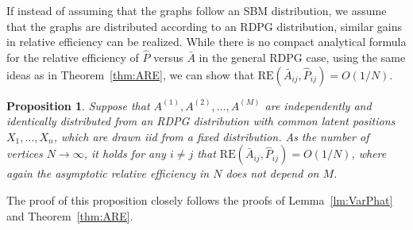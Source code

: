 \documentclass[journal,twoside,web]{ieeecolor}
\newtheorem{proposition}[fact]{Proposition}
\begin{document}



If instead of assuming that the graphs follow an SBM distribution, we assume that the graphs are distributed according to an RDPG distribution, similar gains in relative efficiency can be realized.
While there is no compact analytical formula for the relative efficiency of $\hat{P}$ versus $\bar{A}$ in the general RDPG case, using the same ideas as in Theorem~\ref{thm:ARE}, we can show that $\mathrm{RE}(\bar{A}_{ij},\hat{P}_{ij}) = O(1/N)$.

\begin{proposition}
Suppose that $A^{(1)},A^{(2)},\dotsc,A^{(M)}$ are independently and identically distributed from an RDPG distribution with common latent positions $X_1,\dotsc,X_n$, which are drawn iid from a fixed distribution.
As the number of vertices $N\to\infty$, it holds for any $i\neq j$ that $\mathrm{RE}(\bar{A}_{ij},\hat{P}_{ij}) = O(1/N)$,
where again the asymptotic relative efficiency in $N$ does not depend on $M$.
\end{proposition}
The proof of this proposition closely follows the proofs of Lemma~\ref{lm:VarPhat} and Theorem~\ref{thm:ARE}.
\end{document}
